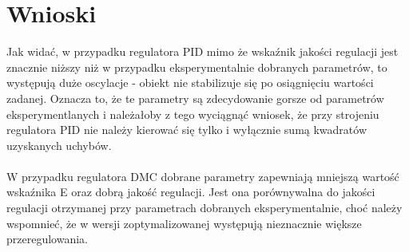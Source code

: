     \newpage
    \section{Wnioski}
    Jak widać, w przypadku regulatora PID mimo że wskaźnik jakości regulacji jest znacznie niższy niż w przypadku eksperymentalnie dobranych parametrów, to występują duże oscylacje - obiekt nie stabilizuje się po osiągnięciu wartości zadanej. Oznacza to, że te parametry są zdecydowanie gorsze od parametrów eksperymentlanych i należałoby z tego wyciągnąć wniosek, że przy strojeniu regulatora PID nie należy kierować się tylko i wyłącznie sumą kwadratów uzyskanych uchybów.
    \paragraph{}
    W przypadku regulatora DMC dobrane parametry zapewniają mniejszą wartość wskaźnika E oraz dobrą jakość regulacji. Jest ona porównywalna do jakości regulacji otrzymanej przy parametrach dobranych eksperymentalnie, choć należy wspomnieć, że w wersji zoptymalizowanej występują nieznacznie większe przeregulowania. 